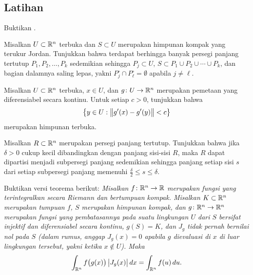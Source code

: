 \subsection{Latihan}

\begin{exercise}
Buktikan .
\end{exercise}

\begin{exercise} \label{mv:changeofvarcoverbyrects}
Misalkan $U \subset {\mathbb{R}}^n$ terbuka
dan $S \subset U$ merupakan himpunan kompak yang terukur Jordan.
Tunjukkan bahwa terdapat berhingga banyak persegi panjang tertutup
$P_1,P_2, \ldots, P_k$ sedemikian sehingga $P_j \subset U$,
$S \subset P_1 \cup P_2 \cup \cdots \cup P_k$, dan
bagian dalamnya saling lepas, yakni
$P_j^\circ \cap P^\circ_\ell = \emptyset$ apabila $j \neq \ell$.
\end{exercise}

\begin{exercise} \label{mv:changeofvarWxopen}
Misalkan $U \subset {\mathbb{R}}^n$ terbuka, $x \in U$,
dan $g \colon U \to {\mathbb{R}}^n$ merupakan pemetaan yang diferensiabel secara kontinu.
Untuk setiap $c > 0$, tunjukkan bahwa
\begin{equation*}
\bigl\{ y \in U : \bigl\lVert {g'(x)-g'(y)} \bigr\rVert < c \bigr\}
\end{equation*}
merupakan himpunan terbuka.
\end{exercise}

\begin{exercise} \label{mv:changeofvarrectside}
Misalkan $R \subset {\mathbb{R}}^n$ merupakan persegi panjang tertutup.
Tunjukkan bahwa jika $\delta > 0$ cukup kecil dibandingkan
dengan panjang sisi-sisi $R$, maka $R$ dapat dipartisi
menjadi subpersegi panjang sedemikian sehingga panjang setiap sisi $s$
dari setiap subpersegi panjang memenuhi $\frac{\delta}{2} \leq s \leq \delta$.
\end{exercise}

\begin{exercise}
Buktikan versi teorema berikut:
\emph{Misalkan $f \colon {\mathbb{R}}^n \to {\mathbb{R}}$ merupakan fungsi yang terintegralkan
secara Riemann dan bertumpuan kompak. Misalkan $K \subset {\mathbb{R}}^n$
merupakan tumpuan $f$, $S$ merupakan himpunan kompak,
dan $g \colon {\mathbb{R}}^n \to {\mathbb{R}}^n$ merupakan
fungsi yang pembatasannya pada suatu lingkungan $U$ dari
$S$ bersifat injektif dan diferensiabel secara kontinu,
$g(S) = K$, dan $J_g$ tidak pernah bernilai nol pada $S$ (dalam rumus,
anggap $J_g(x) = 0$ apabila $g$ dievaluasi di $x$ di luar lingkungan tersebut,
yakni ketika $x \notin
U$). Maka}
\begin{equation*}
\int_{{\mathbb{R}}^n} f\bigl(g(x)\bigr) \, \bigl\lvert {J_g(x)} \bigr\rvert \, dx
=
\int_{{\mathbb{R}}^{n}} f(u) \, du .
\end{equation*}
\end{exercise}

